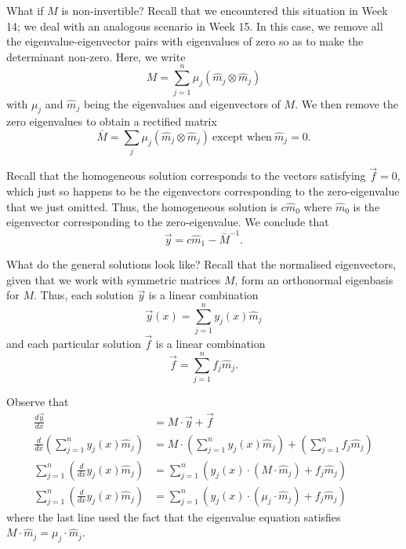 \documentclass[a4paper, 12pt,oneside,openany]{book}
\begin{document}
What if $M$ is non-invertible? Recall that we encountered this situation in Week 14; we deal with an analogous scenario in Week 15. In this case, we remove all the eigenvalue-eigenvector pairs with eigenvalues of zero so as to make the determinant non-zero. Here, we write $$M=\sum\limits_{j=1}^n \mu_j (\hat{m}_j \otimes \hat{m}_j)$$ with $\mu_j$ and $\hat{m}_j$ being the eigenvalues and eigenvectors of $M$. We then remove the zero eigenvalues to obtain a rectified matrix $$\bar{M} = \sum\limits_{j} \mu_j (\hat{m}_j \otimes \hat{m}_j)\ \text{except when}\  \hat{m}_j =0.$$  

Recall that the homogeneous solution corresponds to the vectors satisfying $\vec{f}=0$, which just so happens to be the eigenvectors corresponding to the zero-eigenvalue that we just omitted. Thus, the homogeneous solution is $c \hat{m}_0$ where $\hat{m}_0$ is the eigenvector corresponding to the zero-eigenvalue. We conclude that $$\vec{y} = c\hat{m}_1 - \bar{M}^{-1}.$$


What do the general solutions look like? Recall that the normalised eigenvectors, given that we work with symmetric matrices $M$, form an orthonormal eigenbasis for $M$. Thus, each solution $\vec{y}$ is a linear combination $$\vec{y}(x) = \sum\limits_{j=1}^n y_j(x) \hat{m}_j$$ and each particular solution $\vec{f}$ is a linear combination $$\vec{f} = \sum\limits_{j=1}^n f_j \hat{m}_j.$$ 

Observe that \begin{align*} \frac{d\vec{y}}{dx} &= M \cdot \vec{y} + \vec{f} \\ \frac{d}{dx} \left(\sum\limits_{j=1}^n y_j(x) \hat{m}_j \right)&= M \cdot \left( \sum\limits_{j=1}^n y_j(x) \hat{m}_j \right) + \left( \sum\limits_{j=1}^n f_j \hat{m}_j\right) \\ \sum\limits_{j=1}^n \left(\frac{d}{dx} y_j(x) \hat{m}_j  \right)&= \sum\limits_{j=1}^n \left( y_j(x) \cdot (M \cdot \hat{m}_j) + f_j\hat{m}_j \right) \\ \sum\limits_{j=1}^n \left(\frac{d}{dx} y_j(x) \hat{m}_j  \right)&= \sum\limits_{j=1}^n \left( y_j(x) \cdot (\mu_j \cdot \hat{m}_j) + f_j\hat{m}_j \right) \end{align*} where the last line used the fact that the eigenvalue equation satisfies $M \cdot \hat{m}_j = \mu_j \cdot \hat{m}_j$.
\end{document}
